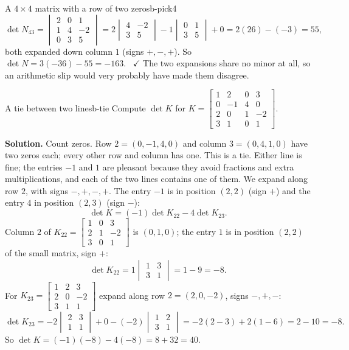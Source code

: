 \documentclass[11pt]{article}
\begin{document}
\begin{exmp}{A $4\times4$ matrix with a row of two zeros}{b-pick4}
\[\]
\[
\det N_{43}=\begin{vmatrix}2&0&1\\1&4&-2\\0&3&5\end{vmatrix}=2\begin{vmatrix}4&-2\\3&5\end{vmatrix}-1\begin{vmatrix}0&1\\3&5\end{vmatrix}+0=2(26)-(-3)=55,
\]
both expanded down column $1$ (signs $+,-,+$). So $\det N=3(-36)-55=-163$. \ $\checkmark$ The two expansions share no minor at all, so an arithmetic slip would very probably have made them disagree.
\end{exmp}

\begin{exmp}{A tie between two lines}{b-tie}
Compute $\det K$ for $K=\begin{bmatrix}1&2&0&3\\0&-1&4&0\\2&0&1&-2\\3&1&0&1\end{bmatrix}$.

\textbf{Solution.} Count zeros. Row $2=(0,-1,4,0)$ and column $3=(0,4,1,0)$ have two zeros each; every other row and column has one. This is a tie. Either line is fine; the entries $-1$ and $1$ are pleasant because they avoid fractions and extra multiplications, and each of the two lines contains one of them. We expand along row $2$, with signs $-,+,-,+$. The entry $-1$ is in position $(2,2)$ (sign $+$) and the entry $4$ in position $(2,3)$ (sign $-$):
\[
\det K=(-1)\det K_{22}-4\det K_{23}.
\]
Column $2$ of $K_{22}=\begin{bmatrix}1&0&3\\2&1&-2\\3&0&1\end{bmatrix}$ is $(0,1,0)$; the entry $1$ is in position $(2,2)$ of the small matrix, sign $+$:
\[
\det K_{22}=1\begin{vmatrix}1&3\\3&1\end{vmatrix}=1-9=-8.
\]
For $K_{23}=\begin{bmatrix}1&2&3\\2&0&-2\\3&1&1\end{bmatrix}$ expand along row $2=(2,0,-2)$, signs $-,+,-$:
\[
\det K_{23}=-2\begin{vmatrix}2&3\\1&1\end{vmatrix}+0-(-2)\begin{vmatrix}1&2\\3&1\end{vmatrix}=-2(2-3)+2(1-6)=2-10=-8.
\]
So $\det K=(-1)(-8)-4(-8)=8+32=40$.


\end{exmp}
\end{document}
